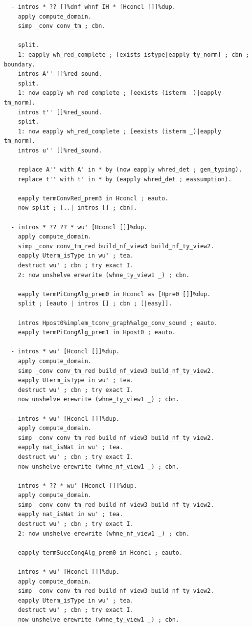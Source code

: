 \begin{lstlisting}
  - intros * ?? []%dnf_whnf IH * [Hconcl []]%dup.
    apply compute_domain.
    simp _conv conv_tm ; cbn.

    split.
    1: eapply wh_red_complete ; [exists istype|eapply ty_norm] ; cbn ; boundary.
    intros A'' []%red_sound.
    split.
    1: now eapply wh_red_complete ; [eexists (isterm _)|eapply tm_norm].
    intros t'' []%red_sound.
    split.
    1: now eapply wh_red_complete ; [eexists (isterm _)|eapply tm_norm].
    intros u'' []%red_sound.

    replace A'' with A' in * by (now eapply whred_det ; gen_typing).
    replace t'' with t' in * by (eapply whred_det ; eassumption).

    eapply termConvRed_prem3 in Hconcl ; eauto.
    now split ; [..| intros [] ; cbn].

  - intros * ?? ?? * wu' [Hconcl []]%dup.
    apply compute_domain.
    simp _conv conv_tm_red build_nf_view3 build_nf_ty_view2.
    eapply Uterm_isType in wu' ; tea.
    destruct wu' ; cbn ; try exact I.
    2: now unshelve erewrite (whne_ty_view1 _) ; cbn.

    eapply termPiCongAlg_prem0 in Hconcl as [Hpre0 []]%dup.
    split ; [eauto | intros [] ; cbn ; [|easy]].

    intros Hpost0%implem_tconv_graph%algo_conv_sound ; eauto.
    eapply termPiCongAlg_prem1 in Hpost0 ; eauto.

  - intros * wu' [Hconcl []]%dup.
    apply compute_domain.
    simp _conv conv_tm_red build_nf_view3 build_nf_ty_view2.
    eapply Uterm_isType in wu' ; tea.
    destruct wu' ; cbn ; try exact I.
    now unshelve erewrite (whne_ty_view1 _) ; cbn.

  - intros * wu' [Hconcl []]%dup.
    apply compute_domain.
    simp _conv conv_tm_red build_nf_view3 build_nf_ty_view2.
    eapply nat_isNat in wu' ; tea.
    destruct wu' ; cbn ; try exact I.
    now unshelve erewrite (whne_nf_view1 _) ; cbn.

  - intros * ?? * wu' [Hconcl []]%dup.
    apply compute_domain.
    simp _conv conv_tm_red build_nf_view3 build_nf_ty_view2.
    eapply nat_isNat in wu' ; tea.
    destruct wu' ; cbn ; try exact I.
    2: now unshelve erewrite (whne_nf_view1 _) ; cbn.

    eapply termSuccCongAlg_prem0 in Hconcl ; eauto.

  - intros * wu' [Hconcl []]%dup.
    apply compute_domain.
    simp _conv conv_tm_red build_nf_view3 build_nf_ty_view2.
    eapply Uterm_isType in wu' ; tea.
    destruct wu' ; cbn ; try exact I.
    now unshelve erewrite (whne_ty_view1 _) ; cbn.


\end{lstlisting}
